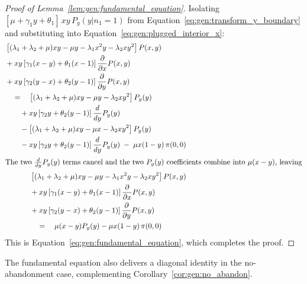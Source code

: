 \begin{proof}[Proof of Lemma~\ref{lem:gen:fundamental_equation}]
    Isolating $[\mu+\gamma_1 y+\theta_1]\,xy\,P_y(y|n_1=1)$ from Equation~\eqref{eq:gen:transform_y_boundary} and substituting into Equation~\eqref{eq:gen:plugged_interior_x}:
    \begin{align*}
        \begin{split}
            & \left[ (\lambda_1+\lambda_2+\mu)xy - \mu y - \lambda_1 x^2 y - \lambda_2 x y^2 \right] P(x,y) \\
            & + xy \left[ \gamma_1(x-y) + \theta_1(x-1) \right] \frac{\partial}{\partial x} P(x,y) \\
            & + xy \left[ \gamma_2(y-x) + \theta_2(y-1) \right] \frac{\partial}{\partial y} P(x,y) \\
            & \quad = \quad \left[ (\lambda_1 + \lambda_2 + \mu)xy - \mu y - \lambda_2 x y^2 \right] P_y(y) \\
            & \quad \quad + xy \left[ \gamma_2 y + \theta_2(y-1) \right] \frac{d}{dy} P_y(y) \\
            & \quad \quad - \left[ (\lambda_1 + \lambda_2 + \mu)xy - \mu x - \lambda_2 x y^2 \right] P_y(y) \\
            & \quad \quad - xy \left[ \gamma_2 y + \theta_2(y-1) \right] \frac{d}{dy} P_y(y)
            \;-\; \mu x(1-y) \, \pi(0,0)
        \end{split} \nonumber \\
        \intertext{The two $\frac{d}{dy}P_y(y)$ terms cancel and the two $P_y(y)$ coefficients combine into $\mu(x-y)$, leaving}
        \begin{split}
            & \left[ (\lambda_1+\lambda_2+\mu)xy - \mu y - \lambda_1 x^2 y - \lambda_2 x y^2 \right] P(x,y) \\
            & + xy \left[ \gamma_1(x-y) + \theta_1(x-1) \right] \frac{\partial}{\partial x} P(x,y) \\
            & + xy \left[ \gamma_2(y-x) + \theta_2(y-1) \right] \frac{\partial}{\partial y} P(x,y) \\
            & \quad = \quad \mu(x-y) P_y(y) - \mu x(1-y) \, \pi(0,0)
        \end{split}
    \end{align*}
    This is Equation~\eqref{eq:gen:fundamental_equation}, which completes the proof.
\end{proof}

The fundamental equation also delivers a diagonal identity in the no-abandonment case, complementing Corollary~\ref{cor:gen:no_abandon}.

